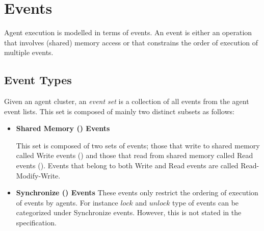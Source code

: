 \section{Events}
        
    Agent execution is modelled in terms of events. An event is either an operation that involves (shared) memory access or that constrains the order of execution of multiple events.

    \subsection{Event Types}
    
        Given an agent cluster, an \textit{event set}  is a collection of all events from the agent event lists. This set is composed of mainly two distinct subsets as follows: 

        \begin{itemize}
            \item \textbf{Shared Memory () Events}
                
                This set is composed of two sets of events; those that write to shared memory called Write events () and those that read from shared memory called Read events (). Events that belong to both Write and Read events are called Read-Modify-Write. 
            
            \item \textbf{Synchronize () Events} 
                These events only restrict the ordering of execution of events by agents. For instance $lock$ and $unlock$ type of events can be categorized under Synchronize events. However, this is not stated in the specification\footnotemark. 
    
        \end{itemize}
        
